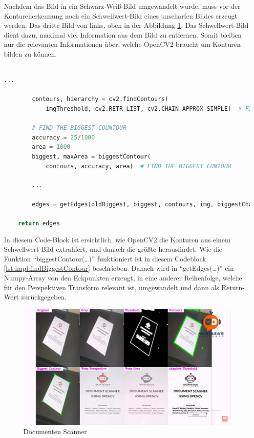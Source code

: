 Nachdem das Bild in ein Schwarz-Weiß-Bild umgewandelt wurde, muss vor der Konturenerkennung noch ein Schwellwert-Bild eines unscharfen Bildes erzeugt werden.
Das dritte Bild von links, oben in der Abbildung \ref{fig:map:documentscanner}. Das Schwellwert-Bild dient dazu, maximal viel Information aus dem Bild zu entfernen. Somit bleiben nur die relevanten Informationen über, welche OpenCV2 braucht um Konturen bilden zu können.\\
\\
\begin{lstlisting}[caption=Erhalten von Konturen,language=Python,label=lst:impl:getContours]
        ...

        contours, hierarchy = cv2.findContours(
            imgThreshold, cv2.RETR_LIST, cv2.CHAIN_APPROX_SIMPLE)  # FIND ALL CONTOURS

        # FIND THE BIGGEST COUNTOUR
        accuracy = 25/1000
        area = 1000
        biggest, maxArea = biggestContour(
            contours, accuracy, area)  # FIND THE BIGGEST CONTOUR

        ...

        edges = getEdges(oldBiggest, biggest, contours, img, biggestChanged)

    return edges
\end{lstlisting}

In diesem Code-Block ist ersichtlich, wie OpenCV2 die Konturen aus einem Schwellwert-Bild extrahiert,
und danach die größte herausfindet.
Wie die Funktion ``biggestContour(\dots)'' funktioniert ist in diesem Codeblock \ref{lst:impl:findBiggestContour} beschrieben. Danach wird in ``getEdges(\dots)'' ein Numpy-Array von den Eckpunkten erzeugt, in eine anderer Reihenfolge, welche für den Perspektiven Transform relevant ist, umgewandelt und dann als Return-Wert zurückgegeben.

\begin{figure}[H]
    \centering
    \includegraphics[scale=1]{pics/maperkennung/documentscanner.png}
    \caption{Documenten Scanner \cite{maai:documentscannerYoutube:cite}}
    \label{fig:map:documentscanner}
\end{figure}

